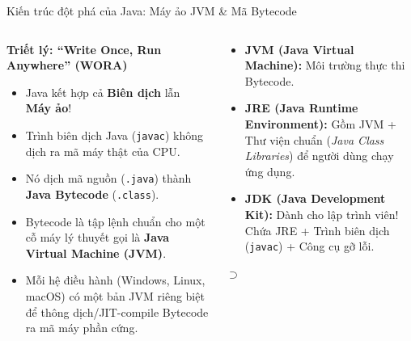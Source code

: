 \documentclass[aspectratio=169, 10pt]{beamer}
\begin{document}
\begin{frame}{Kiến trúc đột phá của Java: Máy ảo JVM \& Mã Bytecode}
  \begin{columns}
    \begin{block}{\textbf{Triết lý: ``Write Once, Run Anywhere'' (WORA)}}
      \begin{itemize}
        \item Java kết hợp cả \textbf{Biên dịch} lẫn \textbf{Máy ảo}!
        \item Trình biên dịch Java (\texttt{javac}) không dịch ra mã máy thật của CPU.
        \item Nó dịch mã nguồn (\texttt{.java}) thành \textbf{Java Bytecode} (\texttt{.class}).
        \item Bytecode là tập lệnh chuẩn cho một cỗ máy lý thuyết gọi là \textbf{Java Virtual Machine (JVM)}.
        \item Mỗi hệ điều hành (Windows, Linux, macOS) có một bản JVM riêng biệt để thông dịch/JIT-compile Bytecode ra mã máy phần cứng.
      \end{itemize}
    \end{block}

    \begin{tcolorbox}[colback=white,colframe=UniBlue,title=\textbf{Bộ công cụ Java (Phân biệt JDK, JRE, JVM)}]
      \small
      \begin{itemize}
        \item \textbf{JVM (Java Virtual Machine):} Môi trường thực thi Bytecode.
        \item \textbf{JRE (Java Runtime Environment):} Gồm JVM + Thư viện chuẩn (\textit{Java Class Libraries}) để người dùng chạy ứng dụng.
        \item \textbf{JDK (Java Development Kit):} Dành cho lập trình viên! Chứa JRE + Trình biên dịch (\texttt{javac}) + Công cụ gỡ lỗi.
      \end{itemize}
      \centering
      \vspace{1mm}
       $\supset$ 
    \end{tcolorbox}
  \end{columns}
\end{frame}
\end{document}
